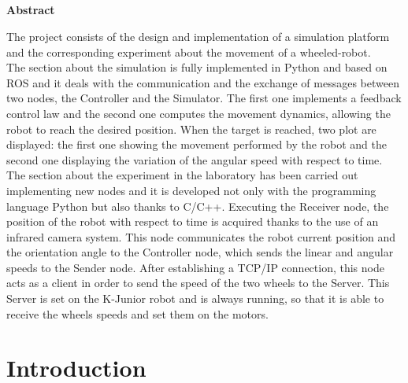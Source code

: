 \documentclass[a4paper,11pt,oneside]{book}
\begin{document}
\pagestyle{myheadings}



\newpage
\thispagestyle{empty}

\begin{center}
\chapter*{}
\thispagestyle{empty}
{\Huge \textbf{Abstract}}\\
\vspace{15mm}
\end{center}

The project consists of the design and implementation of a simulation platform and the corresponding experiment about the movement of a wheeled-robot.
\\The section about the simulation is fully implemented in Python and based on ROS and it deals with the communication and the exchange of messages between two nodes, the Controller and the Simulator. The first one implements a feedback control law and the second one computes the movement dynamics, allowing the robot to reach the desired position. When the target is reached, two plot are displayed: the first one showing the movement performed by the robot and the second one displaying the variation of the angular speed with respect to time.
\\The section about the experiment in the laboratory has been carried out implementing new nodes and it is developed not only with the programming language Python but also thanks to C/C++. Executing the Receiver node, the position of the robot with respect to time is acquired thanks to the use of an infrared camera system. This node communicates the robot current position and the orientation angle to the Controller node, which sends the linear and angular speeds to the Sender node. After establishing a TCP/IP connection, this node acts as a client in order to send the speed of the two wheels to the Server. This Server is set on the K-Junior robot and is always running, so that it is able to receive the wheels speeds and set them on the motors.


\tableofcontents \thispagestyle{empty}
\listoffigures\thispagestyle{empty}

\chapter*{Introduction}
\end{document}
